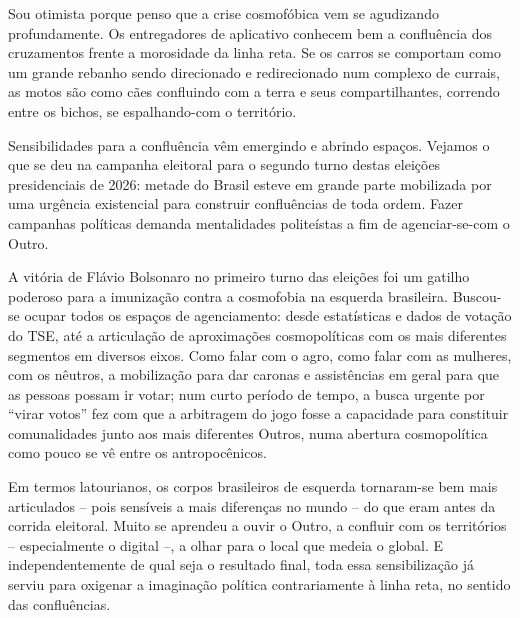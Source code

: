 Sou otimista porque penso que a crise cosmofóbica vem se agudizando profundamente. Os entregadores de aplicativo conhecem bem a confluência dos cruzamentos frente a morosidade da linha reta. Se os carros se comportam como um grande rebanho sendo direcionado e redirecionado num complexo de currais, as motos são como cães confluindo com a terra e seus compartilhantes, correndo entre os bichos, se espalhando-com o território.

Sensibilidades para a confluência vêm emergindo e abrindo espaços. Vejamos o que se deu na campanha eleitoral para o segundo turno destas eleições presidenciais de 2026: metade do Brasil esteve em grande parte mobilizada por uma urgência existencial para construir confluências de toda ordem. Fazer campanhas políticas demanda mentalidades politeístas a fim de agenciar-se-com o Outro.

A vitória de Flávio Bolsonaro no primeiro turno das eleições foi um gatilho poderoso para a imunização contra a cosmofobia na esquerda brasileira. Buscou-se ocupar todos os espaços de agenciamento: desde estatísticas e dados de votação do TSE, até a articulação de aproximações cosmopolíticas com os mais diferentes segmentos em diversos eixos. Como falar com o agro, como falar com as mulheres, com os nêutros, a mobilização para dar caronas e assistências em geral para que as pessoas possam ir votar; num curto período de tempo, a busca urgente por \enquote{virar votos} fez com que a arbitragem do jogo fosse a capacidade para constituir comunalidades junto aos mais diferentes Outros, numa abertura cosmopolítica como pouco se vê entre os antropocênicos.

Em termos latourianos, os corpos brasileiros de esquerda tornaram-se bem mais articulados -- pois sensíveis a mais diferenças no mundo -- do que eram antes da corrida eleitoral. Muito se aprendeu a ouvir o Outro, a confluir com os territórios -- especialmente o digital --, a olhar para o local que medeia o global. E independentemente de qual seja o resultado final, toda essa sensibilização já serviu para oxigenar a imaginação política contrariamente à linha reta, no sentido das confluências.

